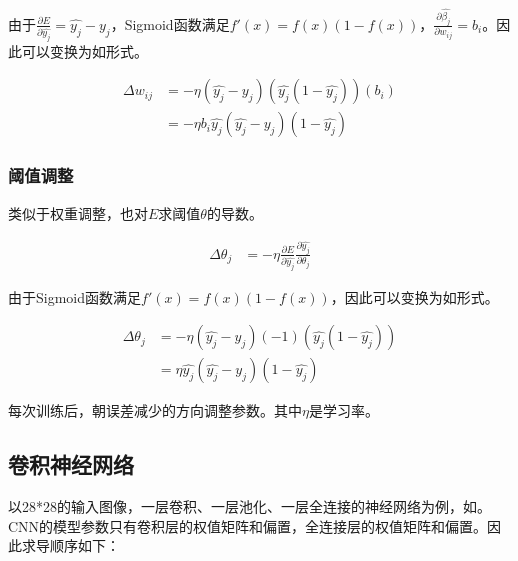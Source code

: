 由于$\frac{\partial E}{\partial \hat{y_j}} = \hat{y_j} - y_j$，Sigmoid函数满足$f\prime(x)=f(x)(1-f(x))$，$\frac{\partial \hat{\beta_j}}{\partial w_{ij}}=b_i$。因此可以变换为如形式。

\begin{equation}\label{eq:update-w-convert}
\begin{aligned}
\Delta w_{ij} &= -\eta (\hat{y_j} - y_j) (\hat{y_j}(1-\hat{y_j})) (b_i) \\
&= -\eta b_i \hat{y_j} (\hat{y_j} - y_j) (1 - \hat{y_j})
\end{aligned}
\end{equation}

\subsubsection{阈值调整}

类似于权重调整，也对$E$求阈值$\theta$的导数。

\begin{equation}\label{eq:update-theta}
\begin{aligned}
\Delta \theta_{j} &= -\eta \frac{\partial E}{\partial \hat{y_j}} \frac{\partial \hat{y_j}}{\partial \theta_j}
\end{aligned}
\end{equation}

由于Sigmoid函数满足$f\prime(x)=f(x)(1-f(x))$，因此可以变换为如形式。

\begin{equation}\label{eq:update-theta-convert}
\begin{aligned}
\Delta \theta_{j} &= -\eta (\hat{y_j} - y_j) (-1)(\hat{y_j}(1-\hat{y_j}))\\
&= \eta \hat{y_j} (\hat{y_j} - y_j) (1-\hat{y_j})
\end{aligned}
\end{equation}

每次训练后，朝误差减少的方向调整参数。其中$\eta$是学习率。

\subsection{卷积神经网络}

以28*28的输入图像，一层卷积、一层池化、一层全连接的神经网络为例，如。CNN的模型参数只有卷积层的权值矩阵和偏置，全连接层的权值矩阵和偏置。因此求导顺序如下：

